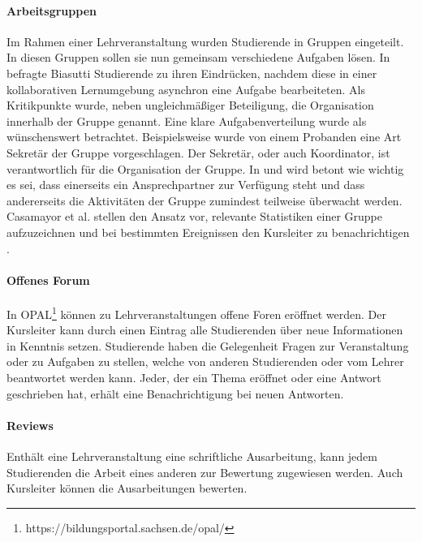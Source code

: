 \documentclass[conference]{IEEEtran}
\begin{document}
\paragraph{Arbeitsgruppen} Im Rahmen einer Lehrveranstaltung wurden Studierende in Gruppen eingeteilt. In diesen Gruppen sollen sie nun gemeinsam verschiedene Aufgaben lösen. In \cite{dewiyanti2007students} befragte Biasutti Studierende zu ihren Eindrücken, nachdem diese in einer kollaborativen Lernumgebung asynchron eine Aufgabe bearbeiteten. Als Kritikpunkte wurde, neben ungleichmäßiger Beteiligung, die Organisation innerhalb der Gruppe genannt. Eine klare Aufgabenverteilung wurde als wünschenswert betrachtet. Beispielsweise wurde von einem Probanden eine Art Sekretär der Gruppe vorgeschlagen. Der Sekretär, oder auch Koordinator, ist verantwortlich für die Organisation der Gruppe. In \cite{paechter2010students} und \cite{casamayor2009intelligent} wird betont wie wichtig es sei, dass einerseits ein Ansprechpartner zur Verfügung steht und dass  andererseits die Aktivitäten der Gruppe zumindest teilweise überwacht werden. Casamayor et al. stellen den Ansatz vor, relevante Statistiken einer Gruppe aufzuzeichnen und bei bestimmten Ereignissen den Kursleiter zu benachrichtigen \cite{casamayor2009intelligent}. 
\paragraph{Offenes Forum} In OPAL\footnote{https://bildungsportal.sachsen.de/opal/} können zu Lehrveranstaltungen offene Foren eröffnet werden. Der Kursleiter kann durch einen Eintrag alle Studierenden über neue Informationen in Kenntnis setzen. Studierende haben die Gelegenheit Fragen zur Veranstaltung oder zu Aufgaben zu stellen, welche von anderen Studierenden oder vom Lehrer beantwortet werden kann. Jeder, der ein Thema eröffnet oder eine Antwort geschrieben hat, erhält eine Benachrichtigung bei neuen Antworten. 
\paragraph{Reviews} Enthält eine Lehrveranstaltung eine schriftliche Ausarbeitung, kann jedem Studierenden die Arbeit eines anderen zur Bewertung zugewiesen werden. Auch Kursleiter können die Ausarbeitungen bewerten. 
	


	
\end{document}
